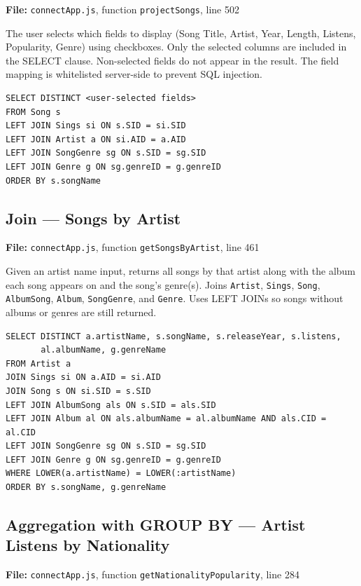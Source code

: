 \documentclass{article}
\begin{document}
\textbf{File:} \texttt{connectApp.js}, function \texttt{projectSongs}, line 502

The user selects which fields to display (Song Title, Artist, Year, Length,
Listens, Popularity, Genre) using checkboxes. Only the selected columns are
included in the SELECT clause. Non-selected fields do not appear in the result.
The field mapping is whitelisted server-side to prevent SQL injection.

\begin{lstlisting}
SELECT DISTINCT <user-selected fields>
FROM Song s
LEFT JOIN Sings si ON s.SID = si.SID
LEFT JOIN Artist a ON si.AID = a.AID
LEFT JOIN SongGenre sg ON s.SID = sg.SID
LEFT JOIN Genre g ON sg.genreID = g.genreID
ORDER BY s.songName
\end{lstlisting}

\subsection{Join --- Songs by Artist}

\textbf{File:} \texttt{connectApp.js}, function \texttt{getSongsByArtist}, line 461

Given an artist name input, returns all songs by that artist along with the
album each song appears on and the song's genre(s). Joins \texttt{Artist},
\texttt{Sings}, \texttt{Song}, \texttt{AlbumSong}, \texttt{Album},
\texttt{SongGenre}, and \texttt{Genre}. Uses LEFT JOINs so songs without albums
or genres are still returned.

\begin{lstlisting}
SELECT DISTINCT a.artistName, s.songName, s.releaseYear, s.listens,
       al.albumName, g.genreName
FROM Artist a
JOIN Sings si ON a.AID = si.AID
JOIN Song s ON si.SID = s.SID
LEFT JOIN AlbumSong als ON s.SID = als.SID
LEFT JOIN Album al ON als.albumName = al.albumName AND als.CID = al.CID
LEFT JOIN SongGenre sg ON s.SID = sg.SID
LEFT JOIN Genre g ON sg.genreID = g.genreID
WHERE LOWER(a.artistName) = LOWER(:artistName)
ORDER BY s.songName, g.genreName
\end{lstlisting}

\subsection{Aggregation with GROUP BY --- Artist Listens by Nationality}

\textbf{File:} \texttt{connectApp.js}, function \texttt{getNationalityPopularity}, line 284
\end{document}
